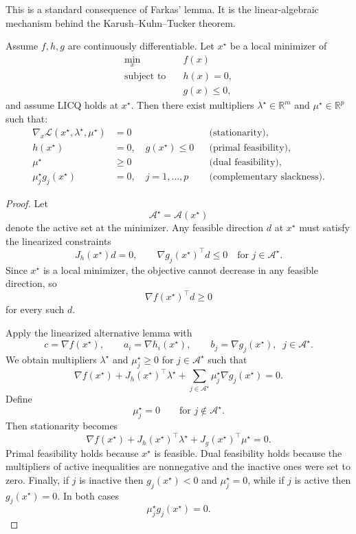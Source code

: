 \begin{remark}
	This is a standard consequence of Farkas' lemma. It is the linear-algebraic mechanism behind the Karush--Kuhn--Tucker theorem.
\end{remark}

\begin{theorem}\label{thm:l3-kkt-necessary-conditions}
	Assume $f,h,g$ are continuously differentiable. Let $x^\star$ be a local minimizer of
	\begin{align*}
		\min_x \quad & f(x) \\
		\text{subject to}\quad & h(x)=0, \\
		                       & g(x)\le 0,
	\end{align*}
	and assume LICQ holds at $x^\star$. Then there exist multipliers $\lambda^\star \in \mathbb{R}^m$ and $\mu^\star \in \mathbb{R}^p$ such that:
	\begin{align*}
		\nabla_x \mathcal{L}(x^\star,\lambda^\star,\mu^\star) & = 0
		&& \text{(stationarity)}, \\
		h(x^\star) & = 0,\quad g(x^\star)\le 0
		&& \text{(primal feasibility)}, \\
		\mu^\star & \ge 0
		&& \text{(dual feasibility)}, \\
		\mu_j^\star g_j(x^\star) & = 0,\quad j=1,\dots,p
		&& \text{(complementary slackness)}.
	\end{align*}
\end{theorem}
\begin{proof}
	Let
	\[
		\mathcal{A}^\star = \mathcal{A}(x^\star)
	\]
	denote the active set at the minimizer. Any feasible direction $d$ at $x^\star$ must satisfy the linearized constraints
	\[
		J_h(x^\star)d=0,
		\qquad
		\nabla g_j(x^\star)^\top d \le 0
		\quad \text{for } j \in \mathcal{A}^\star.
	\]
	Since $x^\star$ is a local minimizer, the objective cannot decrease in any feasible direction, so
	\[
		\nabla f(x^\star)^\top d \ge 0
	\]
	for every such $d$.

	Apply the linearized alternative lemma with
	\[
		c=\nabla f(x^\star),
		\qquad
		a_i=\nabla h_i(x^\star),
		\qquad
		b_j=\nabla g_j(x^\star), \;\; j \in \mathcal{A}^\star.
	\]
	We obtain multipliers $\lambda^\star$ and $\mu_j^\star \ge 0$ for $j \in \mathcal{A}^\star$ such that
	\[
		\nabla f(x^\star)+J_h(x^\star)^\top \lambda^\star
		+\sum_{j \in \mathcal{A}^\star}\mu_j^\star \nabla g_j(x^\star)=0.
	\]
	Define
	\[
		\mu_j^\star=0
		\qquad \text{for } j \notin \mathcal{A}^\star.
	\]
	Then stationarity becomes
	\[
		\nabla f(x^\star)+J_h(x^\star)^\top \lambda^\star+J_g(x^\star)^\top \mu^\star=0.
	\]
	Primal feasibility holds because $x^\star$ is feasible. Dual feasibility holds because the multipliers of active inequalities are nonnegative and the inactive ones were set to zero. Finally, if $j$ is inactive then $g_j(x^\star)<0$ and $\mu_j^\star=0$, while if $j$ is active then $g_j(x^\star)=0$. In both cases
	\[
		\mu_j^\star g_j(x^\star)=0.
	\]
\end{proof}

